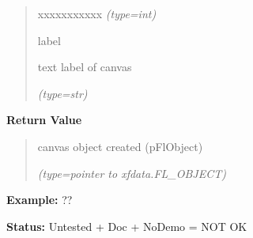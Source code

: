 \begin{boxedminipage}{\funcwidth}
\begin{quote}
\begin{Ventry}{xxxxxxxxxxx}
            {\it (type=int)}

          \item[label]

          text label of canvas

            {\it (type=str)}

        \end{Ventry}

      \end{quote}

      \textbf{Return Value}
    \vspace{-1ex}

      \begin{quote}
      canvas object created (pFlObject)

      {\it (type=pointer to xfdata.FL\_OBJECT)}

      \end{quote}

\textbf{Example:} ??



\textbf{Status:} Untested + Doc + NoDemo = NOT OK



    \end{boxedminipage}

    \label{xformslib:flcanvas:fl_add_canvas}

    \vspace{0.5ex}


